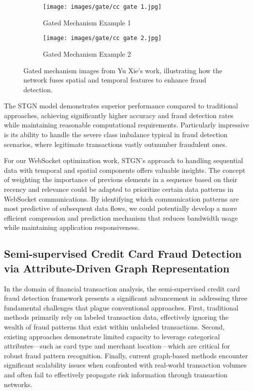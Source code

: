 \documentclass[a4paper, 11pt, twoside, openright]{report}
\begin{document}
\begin{figure}[h!]
    \centering
    \begin{subfigure}[b]{0.48\textwidth}
        \texttt{[image: images/gate/cc gate 1.jpg]} %
        \caption{Gated Mechanism Example 1}
        \label{fig:gate1}
    \end{subfigure}
    \hfill
    \begin{subfigure}[b]{0.48\textwidth}
        \texttt{[image: images/gate/cc gate 2.jpg]} %
        \caption{Gated Mechanism Example 2}
        \label{fig:gate2}
    \end{subfigure}
    \caption{Gated mechanism images from Yu Xie’s work, illustrating how the network fuses spatial and temporal features to enhance fraud detection.}
    \label{fig:gate_group}
\end{figure}


The STGN model demonstrates superior performance compared to traditional approaches, achieving significantly higher accuracy and fraud detection rates while maintaining reasonable computational requirements. Particularly impressive is its ability to handle the severe class imbalance typical in fraud detection scenarios, where legitimate transactions vastly outnumber fraudulent ones.

For our WebSocket optimization work, STGN's approach to handling sequential data with temporal and spatial components offers valuable insights. The concept of weighting the importance of previous elements in a sequence based on their recency and relevance could be adapted to prioritize certain data patterns in WebSocket communications. By identifying which communication patterns are most predictive of subsequent data flows, we could potentially develop a more efficient compression and prediction mechanism that reduces bandwidth usage while maintaining application responsiveness.


\subsection{Semi-supervised Credit Card Fraud Detection via Attribute-Driven Graph Representation}

In the domain of financial transaction analysis, the semi-supervised credit card fraud detection framework presents a significant advancement in addressing three fundamental challenges that plague conventional approaches. First, traditional methods primarily rely on labeled transaction data, effectively ignoring the wealth of fraud patterns that exist within unlabeled transactions. Second, existing approaches demonstrate limited capacity to leverage categorical attributes—such as card type and merchant location—which are critical for robust fraud pattern recognition. Finally, current graph-based methods encounter significant scalability issues when confronted with real-world transaction volumes and often fail to effectively propagate risk information through transaction networks.
\end{document}
